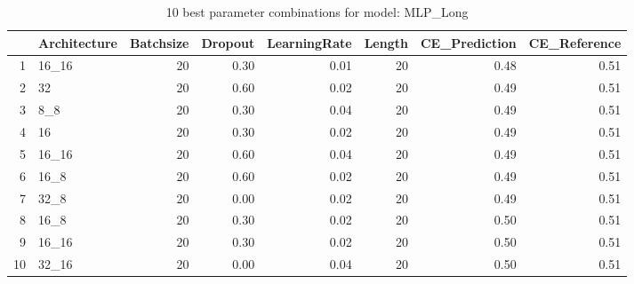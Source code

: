 \begin{table}[ht]
\centering
\begin{tabular}{rlrrrrrr}
  \hline
 & Architecture & Batchsize & Dropout & LearningRate & Length & CE\_Prediction & CE\_Reference \\ 
  \hline
1 & 16\_16 &  20 & 0.30 & 0.01 &  20 & 0.48 & 0.51 \\ 
  2 & 32 &  20 & 0.60 & 0.02 &  20 & 0.49 & 0.51 \\ 
  3 & 8\_8 &  20 & 0.30 & 0.04 &  20 & 0.49 & 0.51 \\ 
  4 & 16 &  20 & 0.30 & 0.02 &  20 & 0.49 & 0.51 \\ 
  5 & 16\_16 &  20 & 0.60 & 0.04 &  20 & 0.49 & 0.51 \\ 
  6 & 16\_8 &  20 & 0.60 & 0.02 &  20 & 0.49 & 0.51 \\ 
  7 & 32\_8 &  20 & 0.00 & 0.02 &  20 & 0.49 & 0.51 \\ 
  8 & 16\_8 &  20 & 0.30 & 0.02 &  20 & 0.50 & 0.51 \\ 
  9 & 16\_16 &  20 & 0.30 & 0.02 &  20 & 0.50 & 0.51 \\ 
  10 & 32\_16 &  20 & 0.00 & 0.04 &  20 & 0.50 & 0.51 \\ 
   \hline
\end{tabular}
\caption{10 best parameter combinations for model: MLP_Long} 
\label{tab:MLP_Long_top_10}
\end{table}
